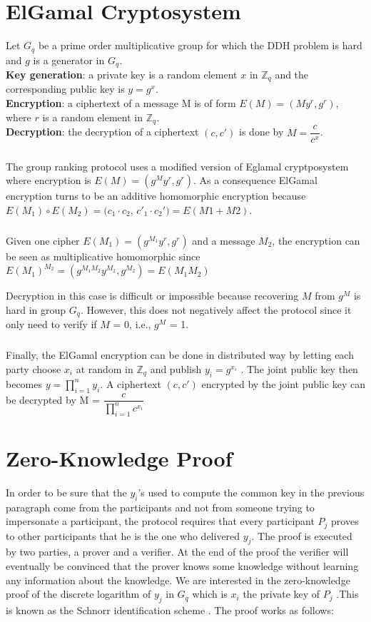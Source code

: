 \documentclass[11pt, a4paper, oneside, openright]{book} %
\begin{document}
\section{ElGamal Cryptosystem}
Let $G_q$ be a prime order multiplicative group for which
the DDH problem is hard and $g$ is a generator in $G_q$. \\ 
\textbf{Key generation}: a private key is a random element $x$ in $\mathbb{Z}_q$ and the corresponding public key is $y = g^x$.\\
\textbf{Encryption}: a ciphertext of a message M is of form
$E(M)=(My^r, g^r)$, where $r$ is a random element in  $\mathbb{Z}_q$.\\
\textbf{Decryption}: the decryption of a ciphertext $(c, c')$ is done
by $M = \dfrac{c}{c^x}$.
\subparagraph{}
The group ranking protocol uses a modified version of 
Eglamal cryptposystem  where encryption is $E(M)=(g^My^r, g^r)$. As a consequence
ElGamal encryption turns to be an additive homomorphic
encryption because $E(M_1)\circ E(M_2)=(c_1\cdot c_2$, $ c'_1\cdot c_2') = E(M1+M2)$. 
\subparagraph{}
Given one cipher $E(M_1)=(g^{M_1}y^r, g^r)$ and a message $M_2$, the encryption can be seen as multiplicative homomorphic since $E(M_1)^{M_2}= (g^{M_1M_2}y^{M_2},g^{M_2}) = E(M_1M_2)$

Decryption in this case is difficult or impossible because
recovering $M$ from $g^M$ is hard in group $G_q$. However, this
does not negatively affect the protocol since it only need
to verify if $M$ = 0, i.e., $g^M$ = 1.
\subparagraph{}
Finally, the ElGamal encryption can be done in distributed way by
letting each party choose $x_i$ at random in $\mathbb{Z}_q$ and publish $y_i = g^{x_i}$ .
The joint public key then becomes $y =\prod_{i=1}^n y_i$. A ciphertext
$(c, c')$ encrypted by the joint public key can be decrypted by M =
$\dfrac{c}{\prod_{i=1}^n c^{x_i}}$

\section{Zero-Knowledge Proof}
In order to be sure that the $y_i$'s used to compute the common key in the previous paragraph come from the participants and not from someone trying to impersonate a participant, the protocol requires that every participant $P_j$ proves to other participants that he is the one who delivered $y_j$. The proof is executed by two parties, a prover and a verifier. At the end of the proof the verifier will eventually be convinced that the prover knows some knowledge without learning any information about the knowledge. We are interested in the zero-knowledge proof of the discrete logarithm of $y_j$ in $G_q$ which is $x_i$ the private key of $P_j$ .This is known as the Schnorr identification scheme \cite{sch}.
The proof works as follows:\\
\end{document}
